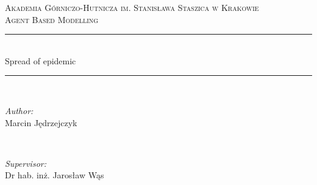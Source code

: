 \documentclass[a4paper, 11pt]{article}
\newcommand{\HRule}{\rule{\linewidth}{0.5mm}} %
\begin{document}
	\begin{titlepage}
	
	
		
		
		
		\center %
		
		
		\textsc{\LARGE Akademia Górniczo-Hutnicza im. Stanisława Staszica w Krakowie}\\[1.5cm] %
		\textsc{\Large Agent Based Modelling}\\[1.5cm]
		
		
		\HRule \\[0.4cm]
		{\fontsize{30}{40}\selectfont Spread of epidemic}
		\HRule \\[5.5cm]
		
		

\begin{minipage}{0.4\textwidth}
\begin{flushleft} \large 
\emph{Author:}\\
Marcin Jędrzejczyk  
\end{flushleft}
\end{minipage}
~
\begin{minipage}{0.4\textwidth}
\begin{flushright} \large
\emph{Supervisor:}\\
 Dr hab. inż. Jarosław Wąs  %
\end{flushright}
\end{minipage} \\[5cm]


\end{titlepage}
\end{document}
